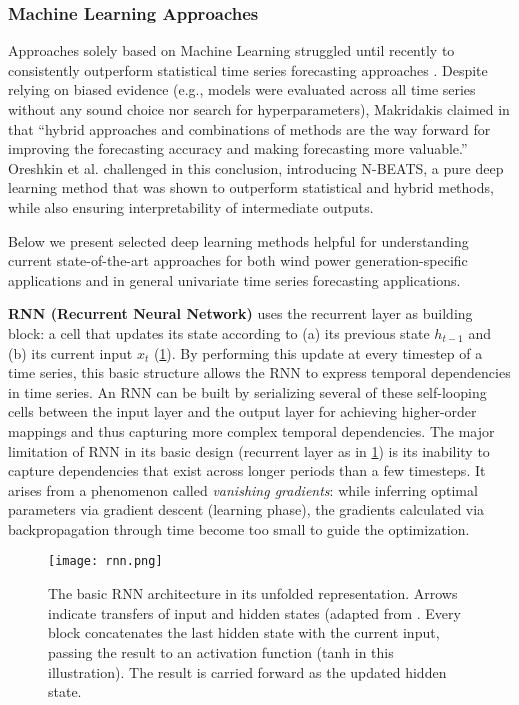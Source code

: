 \subsubsection{Machine Learning Approaches}\label{subsubsec:ml_methods}

Approaches solely based on Machine Learning struggled until recently to consistently outperform statistical time series forecasting approaches \cite{makridakis2018m4}.  Despite relying on biased evidence (e.g., models were evaluated across all time series without any sound choice nor search for hyperparameters), Makridakis claimed in \cite{makridakis2018m4} that ``hybrid approaches and combinations of methods are the way forward for improving the forecasting accuracy and making forecasting more valuable.'' Oreshkin et al. challenged in \cite{oreshkin2019nbeats} this conclusion, introducing N-BEATS, a pure deep learning method that was shown to outperform statistical and hybrid methods, while also ensuring interpretability of intermediate outputs.

Below we present selected deep learning methods helpful for understanding current state-of-the-art approaches for both wind power generation-specific applications and in general univariate time series forecasting applications.

\vspace{1em}
\noindent
\textbf{RNN (Recurrent Neural Network)} uses the recurrent layer as building block: a cell that updates its state according to (a) its previous state $h_{t-1}$ and (b) its current input $x_t$ (\ref{fig:rnn}). By performing this update at every timestep of a time series, this basic structure allows the RNN to express temporal dependencies in time series. An RNN can be built by serializing several of these self-looping cells between the input layer and the output layer for achieving higher-order mappings and thus capturing more complex temporal dependencies. The major limitation of RNN in its basic design (recurrent layer as in \ref{fig:rnn}) is its inability to capture dependencies that exist across longer periods than a few timesteps. It arises from a phenomenon called \textit{vanishing gradients}: while inferring optimal parameters via gradient descent (learning phase), the gradients calculated via backpropagation through time become too small to guide the optimization.
\begin{figure}[H]
	\centering
    \caption{The basic RNN architecture in its unfolded representation. Arrows indicate transfers of input and hidden states (adapted from \cite{paneru2015lstm}. Every block concatenates the last hidden state with the current input, passing the result to an activation function (tanh in this illustration). The result is carried forward as the updated hidden state.}
    \texttt{[image: rnn.png]}
	\label{fig:rnn}
\end{figure}

